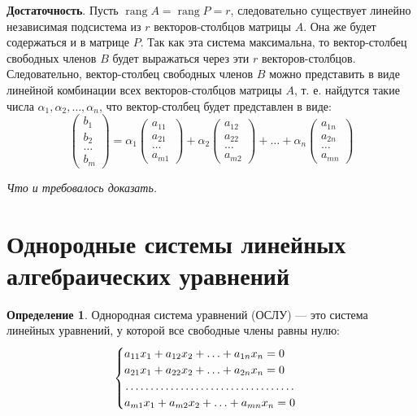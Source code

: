 \documentclass[a5paper, 11pt]{extbook}
\theoremstyle{definition}
\theoremstyle{definition}
\newtheorem{definition}{Определение}[section]
\theoremstyle{definition}
\newcommand{\newpar}{$ $\par\nobreak\ignorespaces}
\renewenvironment{proof}{{\noindent\bfseries Доказательство.}}{\smallskip\newpar \hfill\textit{Что и требовалось доказать.}}
\DeclareMathOperator{\rang}{rang}
\begin{document}
\begin{proof}
    \textbf{Достаточность}. Пусть \(\rang A = \rang P = r\), следовательно существует линейно независимая подсистема из \(r\) векторов-столбцов матрицы \(A\). Она же будет содержаться и в матрице \(P\). Так как эта система максимальна, то вектор-столбец свободных членов \(B\) будет выражаться через эти \(r\) векторов-столбцов. Следовательно, вектор-столбец свободных членов \(B\) можно представить в виде линейной комбинации всех векторов-столбцов матрицы \(A\), т. е. найдутся такие числа \(\alpha_1, \alpha_2, \ldots, \alpha_n\), что вектор-столбец будет представлен в виде:
    \begin{equation*}
        \begin{pmatrix}
            b_1    \\
            b_2    \\
            \ldots \\
            b_m
        \end{pmatrix}
        =
        \alpha_1
        \begin{pmatrix}
            a_{11} \\
            a_{21} \\
            \ldots \\
            a_{m1}
        \end{pmatrix}
        +
        \alpha_2
        \begin{pmatrix}
            a_{12} \\
            a_{22} \\
            \ldots \\
            a_{m2}
        \end{pmatrix}
        + \ldots +
        \alpha_n
        \begin{pmatrix}
            a_{1n} \\
            a_{2n} \\
            \ldots \\
            a_{mn}
        \end{pmatrix}
    \end{equation*}
\end{proof}


\section{Однородные системы линейных алгебраических уравнений}

\begin{definition}
    Однородная система уравнений (ОСЛУ) — это система линейных уравнений, у которой все свободные члены равны нулю:
    \begin{equation*}
        \begin{cases}
            a_{11} x_1 + a_{12} x_2 + \ldots + a_{1n} x_n = 0 \\
            a_{21} x_1 + a_{22} x_2 + \ldots + a_{2n} x_n = 0 \\
            \dotfill                                          \\
            a_{m1} x_1 + a_{m2} x_2 + \ldots + a_{mn} x_n = 0
        \end{cases}
    \end{equation*}
\end{definition}
\end{document}
